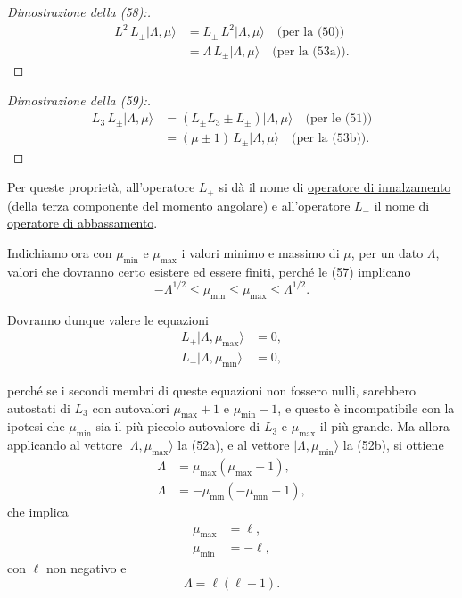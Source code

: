 \documentclass[11pt, a4paper]{book}
\numberwithin{equation}{section}
\begin{document}
\begin{proof}[Dimostrazione della (58):]
\begin{align*}
L^2\,L_\pm|\Lambda,\mu\rangle
  &= L_\pm\,L^2|\Lambda,\mu\rangle \quad \text{(per la (50))} \\
  &= \Lambda\,L_\pm|\Lambda,\mu\rangle \quad \text{(per la (53a))}.
\end{align*}
\end{proof}

\begin{proof}[Dimostrazione della (59):]
\begin{align*}
L_3\,L_\pm|\Lambda,\mu\rangle
  &= (L_\pm L_3 \pm L_\pm)|\Lambda,\mu\rangle \quad \text{(per le (51))} \\
  &= (\mu\pm1)\,L_\pm|\Lambda,\mu\rangle \quad \text{(per la (53b))}.
\end{align*}
\end{proof}

Per queste proprietà, all'operatore $L_+$ si dà il nome di
\uline{operatore di innalzamento} (della terza componente del momento
angolare) e all'operatore $L_-$ il nome di \uline{operatore di
abbassamento}.

Indichiamo ora con $\mu_{\min}$ e $\mu_{\max}$ i valori minimo e massimo
di $\mu$, per un dato $\Lambda$, valori che dovranno certo esistere ed
essere finiti, perché le (57) implicano
\begin{equation}
-\Lambda^{1/2} \leq \mu_{\min} \leq \mu_{\max} \leq \Lambda^{1/2}.
\end{equation}

Dovranno dunque valere le equazioni
\begin{align}
L_+|\Lambda,\mu_{\max}\rangle &= 0, \tag{61a} \\
L_-|\Lambda,\mu_{\min}\rangle &= 0, \tag{61b}
\end{align}


perché se i secondi membri di queste equazioni non fossero nulli,
sarebbero autostati di $L_3$ con autovalori $\mu_{\max}+1$ e
$\mu_{\min}-1$, e questo è incompatibile con la ipotesi che $\mu_{\min}$
sia il più piccolo autovalore di $L_3$ e $\mu_{\max}$ il più grande. Ma
allora applicando al vettore $|\Lambda,\mu_{\max}\rangle$ la (52a), e al
vettore $|\Lambda,\mu_{\min}\rangle$ la (52b), si ottiene
\begin{align}
\Lambda &= \mu_{\max}(\mu_{\max}+1), \tag{62a} \\
\Lambda &= -\mu_{\min}(-\mu_{\min}+1), \tag{62b}
\end{align}
che implica
\begin{align}
\mu_{\max} &= \ell, \tag{63a} \\
\mu_{\min} &= -\ell, \tag{63b}
\end{align}
con $\ell$ non negativo e
\begin{equation}
\Lambda = \ell(\ell+1).
\end{equation}
\end{document}
